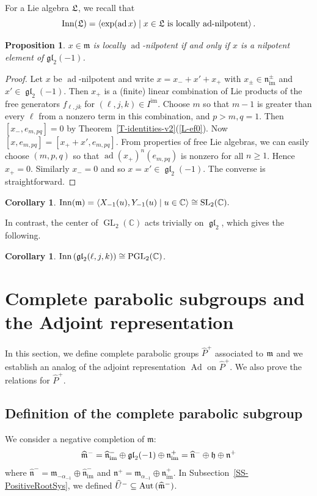 \documentclass[11pt,letterpaper]{amsart}
\newcounter{thecounter}
\numberwithin{thecounter}{section}
\newtheorem{proposition}[thecounter]{Proposition}
\newtheorem{corollary}[thecounter]{Corollary}
\theoremstyle{definition}
\DeclareMathOperator{\SL}{SL}
\DeclareMathOperator{\GL}{GL}
\DeclareMathOperator{\PGL}{PGL}
\DeclareMathOperator{\gl}{\mathfrak{gl}}
\DeclareMathOperator{\Aut}{Aut}
\DeclareMathOperator{\Inn}{Inn}
\DeclareMathOperator{\Ad}{Ad}
\DeclareMathOperator{\ad}{ad}
\DeclareMathOperator{\im}{{im}}
\renewcommand{\a}{\alpha}
\newcommand{\C}{{\mathbb C}}
\newcommand{\Uhm}{{\widehat{U}^-}}
\newcommand{\Php}{{\widehat{P}^+}}
\newcommand{\m}{{\mathfrak{m}}}
\newcommand{\np}{{\mathfrak{n}^+}}
\newcommand{\nhm}{{\widehat{\mathfrak{n}}^-}}
\newcommand{\nimp}{{\mathfrak{n}_{\im}^+}}
\newcommand{\nhimm}{{\widehat{\mathfrak{n}}_{\im}^-}}
\newcommand{\nimpm}{{\mathfrak{n}_{\im}^\pm}}
\begin{document}
For a Lie algebra $\frak L$,  we recall that %
 $$\Inn(\frak L)=\left\langle \exp(\ad x)\mid x\in\frak L\text{  is locally $\ad$-nilpotent} \right\rangle.$$
\begin{proposition}
 $x\in\m$ is locally $\ad$-nilpotent if and only if $x$ is a nilpotent element of $\mathfrak{gl}_2(-1)$.
\end{proposition}
\begin{proof} 
Let $x$ be $\ad$-nilpotent and write $x=x_-+x'+x_+$ with $x_\pm\in\nimpm$ and $x'\in \gl_2(-1)$.
Then $x_+$ is a (finite) linear combination of Lie products of the free generators $f_{\ell,jk}$ for $(\ell,j,k)\in I^{\im}$. Choose $m$ so that $m-1$ is greater than every $\ell$ from a nonzero term in this combination, and $p>m, q=1$.
Then $[x_{-},e_{m,pq}]=0$ by Theorem~\ref{T-identities-v2}(\ref{L-ef0}).
Now $[x,e_{m,pq}] = [x_++x',e_{m,pq}]$.
From properties of free Lie algebras, we can easily choose $(m,p,q)$ so that $\ad(x_+)^n(e_{m,pq})$ is nonzero for all $n\ge 1$. Hence $x_+=0$. Similarly $x_-=0$ and so $x=x'\in\gl_2(-1)$.
The converse is straightforward.
\end{proof}
\begin{corollary}
$\Inn(\frak m) = \left\langle X_{-1}(u), Y_{-1}(u) \mid u\in\C \right\rangle \cong \SL_2(\C).$
\end{corollary}

In contrast, the center of $\GL_2(\C)$ acts trivially on $\gl_2$, which gives the following.
\begin{corollary} $\Inn\left(\frak{gl}_2(\ell,j,k) \right)\cong\PGL_2(\C)$.
\end{corollary}







\section{Complete parabolic subgroups and the Adjoint representation}\label{S-related}
In this section, we define   complete  parabolic groups $\Php$ associated to $\frak m$ and we establish an analog of the adjoint representation $\Ad$ on $\Php$. We also prove the relations for $\Php$.




\subsection{Definition of the complete parabolic subgroup}\label{SS-parab}
We consider a negative completion of $\m$:
$$\widehat{\frak m}^- = \nhimm \oplus \frak{gl}_2({-1}) \oplus \nimp 
  =  \nhm \oplus \frak h \oplus \np$$
where
$\nhm = \mathfrak{m}_{-\a_{-1}} \oplus\nhimm$ and $\np = \mathfrak{m}_{\a_{-1}} \oplus\nimp$.
In Subsection~\ref{SS-PositiveRootSys}, we  defined $\Uhm\subseteq \Aut\left(\widehat{\frak m}^-\right)$. 
\end{document}
